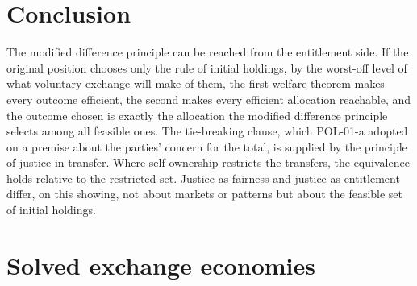 \documentclass{situationist-preprint}
\begin{document}
\section{Conclusion}

The modified difference principle can be reached from the entitlement side. If the original position chooses only the rule of initial holdings, by the worst-off level of what voluntary exchange will make of them, the first welfare theorem makes every outcome efficient, the second makes every efficient allocation reachable, and the outcome chosen is exactly the allocation the modified difference principle selects among all feasible ones. The tie-breaking clause, which POL-01-a adopted on a premise about the parties' concern for the total, is supplied by the principle of justice in transfer. Where self-ownership restricts the transfers, the equivalence holds relative to the restricted set. Justice as fairness and justice as entitlement differ, on this showing, not about markets or patterns but about the feasible set of initial holdings.

\appendix

\section{Solved exchange economies}\label{app:econ}
\end{document}

